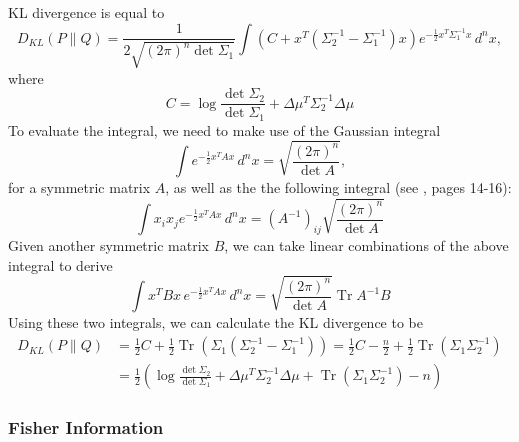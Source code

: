 \documentclass{article}
\newcommand*{\Pn}[1]{\left( #1 \right)}
\DeclareMathOperator{\Tr}{Tr}
\begin{document}
KL divergence is equal to
\[
    D_{KL}(P\| Q)=\frac{1}{2\sqrt{(2\pi)^n\det\Sigma_1}} \int (C+x^T(\Sigma_2^{-1}-\Sigma_1^{-1})x)e^{-\frac12 x^T\Sigma_1^{-1}x}\,d^nx,
\]
where
\[
    C=\log\frac{\det\Sigma_2}{\det\Sigma_1}+\Delta\mu^T\Sigma_2^{-1}\Delta\mu
\]
To evaluate the integral, we need to make use of the Gaussian integral
\[
    \int e^{-\frac12 x^TAx}\,d^nx=\sqrt{\frac{(2\pi)^n}{\det A}},
\]
for a symmetric matrix $A$, as well as the the following integral (see
\cite{zee}, pages 14-16):
\[
    \int x_ix_je^{-\frac12 x^TAx}\,d^nx=(A^{-1})_{ij}\sqrt{\frac{(2\pi)^n}{\det A}}
\]
Given another symmetric matrix $B$, we can take linear combinations of the
above integral to derive
\[
    \int x^TBx\,e^{-\frac12 x^TAx}\,d^nx=\sqrt{\frac{(2\pi)^n}{\det A}}\Tr{A^{-1}B}
\]
Using these two integrals, we can calculate the KL divergence to be
\begin{align*}
    D_{KL}(P\| Q)&=\frac12 C+\frac12\Tr(\Sigma_1(\Sigma_2^{-1}-\Sigma_1^{-1}))
    =\frac12 C-\frac n2+\frac12\Tr(\Sigma_1\Sigma_2^{-1})\\
    &=\frac12\Pn{\log\frac{\det\Sigma_2}{\det\Sigma_1}+\Delta\mu^T\Sigma_2^{-1}\Delta\mu+\Tr(\Sigma_1\Sigma_2^{-1})-n}
\end{align*}

\subsubsection{Fisher Information}
\end{document}
